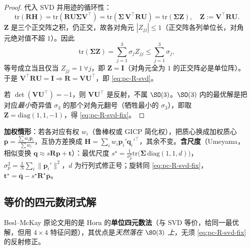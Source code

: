 \begin{proof}
代入 SVD 并用迹的循环性：
\begin{equation}
  \mathrm{tr}(\mathbf{R}\mathbf{H})=\mathrm{tr}(\mathbf{R}\mathbf{U}\boldsymbol{\Sigma}\mathbf{V}^\top)
  =\mathrm{tr}(\boldsymbol{\Sigma}\,\mathbf{V}^\top\mathbf{R}\mathbf{U})=\mathrm{tr}(\boldsymbol{\Sigma}\mathbf{Z}),\quad \mathbf{Z}:=\mathbf{V}^\top\mathbf{R}\mathbf{U}.
\end{equation}
$\mathbf{Z}$ 是三个正交阵之积，仍正交，故各对角元 $|Z_{jj}|\le1$（正交阵各列单位长，对角元绝对值不超 $1$）。因此
\begin{equation}
  \mathrm{tr}(\boldsymbol{\Sigma}\mathbf{Z})=\sum_{j=1}^{3}\sigma_j Z_{jj}\le\sum_{j=1}^{3}\sigma_j,
\end{equation}
等号成立当且仅当 $Z_{jj}=1\ \forall j$，即 $\mathbf{Z}=\mathbf{I}$（对角元全为 $1$ 的正交阵必是单位阵）。于是 $\mathbf{V}^\top\mathbf{R}\mathbf{U}=\mathbf{I}\Rightarrow\mathbf{R}=\mathbf{V}\mathbf{U}^\top$，即 \cref{eq:pc-R-svd}。

若 $\det(\mathbf{V}\mathbf{U}^\top)=-1$，则 $\mathbf{V}\mathbf{U}^\top$ 是反射，不属 $\SO(3)$。$\SO(3)$ 内的最优解是把对应\emph{最小}奇异值 $\sigma_3$ 的那个对角元翻号（牺牲最小的 $\sigma_3$），即取 $\mathbf{Z}=\mathrm{diag}(1,1,-1)$，得 \cref{eq:pc-R-svd-fix}。
\end{proof}

\begin{note}
\textbf{加权情形}：若各对应有权 $w_i$（鲁棒权或 GICP 简化权），把质心换成加权质心 $\bar{\mathbf{p}}=\frac{\sum w_i\mathbf{p}_i}{\sum w_i}$，互协方差换成 $\mathbf{H}=\sum_i w_i\mathbf{p}_i'\mathbf{q}_i'^\top$，其余不变。\textbf{含尺度}（Umeyama，相似变换 $\mathbf{q}\approx s\mathbf{R}\mathbf{p}+\mathbf{t}$）：最优尺度 $s^\star=\frac{1}{\sigma_p^2}\mathrm{tr}\!\big(\boldsymbol{\Sigma}\,\mathrm{diag}(1,1,d)\big)$，$\sigma_p^2=\frac{1}{N}\sum_i\|\mathbf{p}_i'\|^2$，$d$ 为行列式修正号；旋转同 \cref{eq:pc-R-svd-fix}，$\mathbf{t}^\star=\bar{\mathbf{q}}-s^\star\mathbf{R}^\star\bar{\mathbf{p}}$。
\end{note}

\subsection{等价的四元数闭式解}
\label{sec:pc-icp-quat}

Besl--McKay 原论文用的是 Horn 的\textbf{单位四元数法}（与 SVD 等价，给同一最优解，但用 $4\times4$ 特征问题），其优点是\emph{天然落在 $\SO(3)$ 上}，无须 \cref{eq:pc-R-svd-fix} 的反射修正\cite{horn1987absolute,besl1992icp}。

